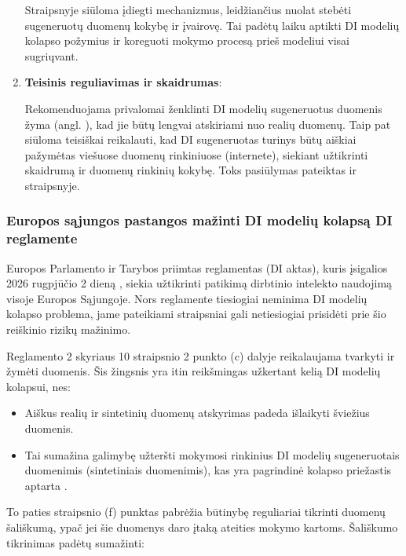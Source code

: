 \documentclass{VUMIFInfKursinis}
\begin{document}
\begin{enumerate}
        Straipsnyje siūloma įdiegti mechanizmus, leidžiančius nuolat stebėti sugeneruotų duomenų kokybę ir įvairovę. Tai padėtų laiku aptikti DI modelių kolapso požymius ir koreguoti mokymo procesą prieš modeliui visai sugriųvant.
    

    \item \textbf{Teisinis reguliavimas ir skaidrumas}:
    
         Rekomenduojama privalomai ženklinti DI modelių sugeneruotus duomenis žyma (angl. ), kad jie būtų lengvai atskiriami nuo realių duomenų. Taip pat siūloma teisiškai reikalauti, kad DI sugeneruotas turinys būtų aiškiai pažymėtas viešuose duomenų rinkiniuose (internete), siekiant užtikrinti skaidrumą ir duomenų rinkinių kokybę. Toks pasiūlymas pateiktas ir \cite{ModelsGoMAD} straipsnyje. 
    
\end{enumerate}


\subsubsection{Europos sąjungos pastangos mažinti DI modelių kolapsą DI reglamente}

Europos Parlamento ir Tarybos priimtas reglamentas (DI aktas), kuris įsigalios 2026 rugpjūčio 2 dieną \cite{AIEuropeanAct}, siekia užtikrinti patikimą dirbtinio intelekto naudojimą visoje Europos Sąjungoje. Nors reglamente tiesiogiai neminima DI modelių kolapso problema, jame pateikiami straipsniai gali netiesiogiai prisidėti prie šio reiškinio rizikų mažinimo. 

Reglamento 2 skyriaus 10 straipsnio 2 punkto (c) dalyje reikalaujama tvarkyti ir žymėti duomenis. Šis žingsnis yra itin reikšmingas užkertant kelią DI modelių kolapsui, nes:

\begin{itemize}
    \item Aiškus realių ir sintetinių duomenų atskyrimas padeda išlaikyti šviežius duomenis.
    \item Tai sumažina galimybę užteršti mokymosi rinkinius DI modelių sugeneruotais duomenimis (sintetiniais duomenimis), kas yra pagrindinė kolapso priežastis aptarta \cite{ModelsGoMAD}.
\end{itemize}

To paties straipsnio (f) punktas pabrėžia būtinybę reguliariai tikrinti duomenų šališkumą, ypač jei šie duomenys daro įtaką ateities mokymo kartoms. Šališkumo tikrinimas padėtų sumažinti:
\end{document}
